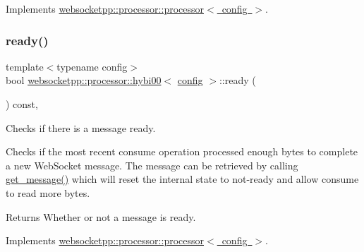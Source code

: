 Implements \mbox{\hyperlink{classwebsocketpp_1_1processor_1_1processor_a64caf3ebac5333112f48eec496ec2a47}{websocketpp\+::processor\+::processor$<$ config $>$}}.

\mbox{\label{classwebsocketpp_1_1processor_1_1hybi00_a8a0ebdb322dad95ea3c7aee8e5c56b9a}} 
\subsubsection{\texorpdfstring{ready()}{ready()}}
{\footnotesize\ttfamily template$<$typename config$>$ \\
bool \mbox{\hyperlink{classwebsocketpp_1_1processor_1_1hybi00}{websocketpp\+::processor\+::hybi00}}$<$ \mbox{\hyperlink{classconfig}{config}} $>$\+::ready (\begin{DoxyParamCaption}{ }\end{DoxyParamCaption}) const\hspace{0.3cm}{\ttfamily [inline]}, {\ttfamily [virtual]}}



Checks if there is a message ready. 

Checks if the most recent consume operation processed enough bytes to complete a new Web\+Socket message. The message can be retrieved by calling \mbox{\hyperlink{classwebsocketpp_1_1processor_1_1hybi00_af5f3b4bec38c586e31c0574b6c3f56b8}{get\+\_\+message()}} which will reset the internal state to not-\/ready and allow consume to read more bytes.

\begin{DoxyReturn}{Returns}
Whether or not a message is ready. 
\end{DoxyReturn}


Implements \mbox{\hyperlink{classwebsocketpp_1_1processor_1_1processor_a623344489598696c98cecebb03c18333}{websocketpp\+::processor\+::processor$<$ config $>$}}.

\mbox{\label{classwebsocketpp_1_1processor_1_1hybi00_a9458e35fabf2b39bd9e09523ad60c22c}} 
